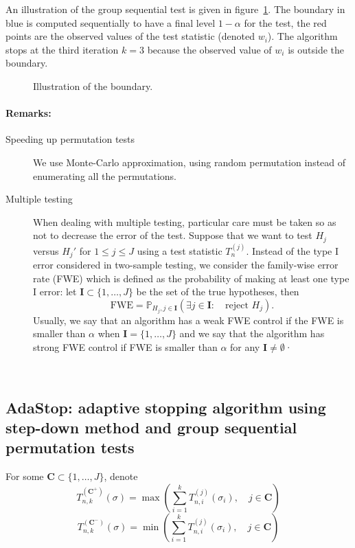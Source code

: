 \documentclass{article}
\theoremstyle{plain}
\theoremstyle{remark}
\renewcommand{\P}{\mathbb{P}}
\newcommand{\1}{\mathbbm{1}}
\numberwithin{equation}{section}
\begin{document}
An illustration of the group sequential test is given in figure~\ref{fig:gst}. The boundary in blue is computed sequentially to have a final level $1-\alpha$ for the test, the red points are the observed values of the test statistic (denoted $w_i$). The algorithm stops at the third iteration $k=3$ because the observed value of $w_i$ is outside the boundary.

\begin{figure}
\begin{center}

\caption{Illustration of the boundary.\label{fig:gst}}
\end{center}
\end{figure}


\paragraph{Remarks:}
\begin{description}
\item[Speeding up permutation tests]
We use Monte-Carlo approximation, using random permutation instead of enumerating all the permutations.

\item[Multiple testing]
When dealing with multiple testing, particular care must be taken so as not to decrease the error of the test. Suppose that we want to test $H_j$ versus $H_j'$ for $1\le j\le J$ using a test statistic $T_{n}^{(j)}$. Instead of the type I error considered in two-sample testing, we consider the family-wise error rate (FWE) which is defined as the probability of making at least one type I error: let $\textbf{I}\subset \{1,\dots,J\}$ be the set of the true hypotheses, then 
$$\mathrm{FWE} = \P_{H_j, j \in \textbf{I}}\left(\exists j \in \textbf{I}:\quad  \text{reject }H_j \right).$$
Usually, we say that an algorithm has a weak FWE control if the FWE is smaller than $\alpha$ when $\textbf{I}=\{1,\dots,J\}$ and we say that the algorithm has strong FWE control if FWE is smaller than $\alpha$ for any $\textbf{I}\neq \emptyset$· 
\end{description}

\
\subsection{AdaStop: adaptive stopping algorithm using step-down method and group sequential permutation tests}
For some $\textbf{C} \subset \{1,\dots,J\}$, denote
$$T_{n,k}^{(\textbf{C}^+)}(\sigma)= \max\left(\sum_{i=1}^kT_{n,i}^{(j)}(\sigma_i),\quad j \in \textbf{C}\right)$$
$$T_{n,k}^{(\textbf{C}^-)}(\sigma)= \min\left(\sum_{i=1}^kT_{n,i}^{(j)}(\sigma_i),\quad j \in \textbf{C}\right)$$
\end{document}
